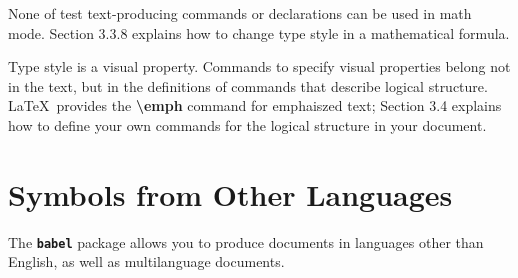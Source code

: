 \documentclass[twocolumn]{book}        %
\begin{document}
None of test text-producing commands or declarations can be used in math mode.
Section 3.3.8 explains how to change type style in a mathematical formula.

Type style is a visual property.
Commands to specify visual properties belong not in the text, but in the 
definitions of commands that describe logical structure.
\LaTeX\ provides the \textbf{\textbackslash emph} command for emphaiszed text;
Section 3.4 explains how to define your own commands for the logical structure in your document.

\section{Symbols from Other Languages}

The \textbf{\tt babel} package allows you to produce documents in languages other than English,
as well as multilanguage documents.
\end{document}
